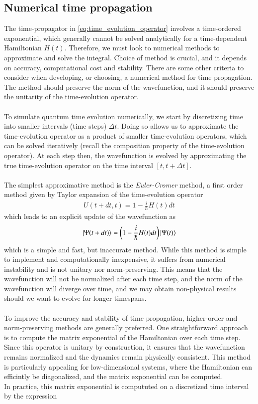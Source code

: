 \documentclass{subfiles}
\begin{document}
\subsection{Numerical time propagation}
The time-propagator in \eqref{eq:time_evolution_operator} involves a time-ordered exponential, which generally cannot be solved analytically for a time-dependent Hamiltonian $H(t)$. Therefore, we must look to numerical methods to approximate and solve the integral. Choice of method is crucial, and it depends on accuracy, computational cost and stability. There are some other criteria to consider when developing, or choosing, a numerical method for time propagation. The method should preserve the norm of the wavefunction, and it should preserve the unitarity of the time-evolution operator. 
\\\\ 
To simulate quantum time evolution numerically, we start by discretizing time into smaller intervals (time steps) $\Delta t$. Doing so allows us to approximate the time-evolution operator as a product of smaller time-evolution operators, which can be solved iteratively (recall the composition property of the time-evolution operator). At each step then, the wavefunction is evolved by approximating the true time-evolution operator on the time interval $[t, t+\Delta t]$. \\ \\
The simplest approximative method is the \emph{Euler-Cromer} method, a first order method given by Taylor expansion of the time-evolution operator
\begin{align}
    U(t + dt, t) = 1 - \frac{i}{\hbar}H(t)dt\label{eq:euler_cromer}
\end{align}
which leads to an explicit update of the wavefunction as 
\begin{align*}
    \ket{\Psi(t + dt)} = \bigg(1 - \frac{i}{\hbar}H(t)dt\bigg)\ket{\Psi(t)}
\end{align*}
which is a simple and fast, but inaccurate method. While this method is simple to implement and computationally inexpensive, it suffers from numerical instability and is not unitary nor norm-preserving. This means that the wavefunction will not be normalized after each time step, and the norm of the wavefunction will diverge over time, and we may obtain non-physical results should we want to evolve for longer timespans. \\ \\ 
To improve the accuracy and stability of time propagation, higher-order and norm-preserving methods are generally preferred. One straightforward approach is to compute the matrix exponential of the Hamiltonian over each time step. Since this operator is unitary by construction, it ensures that the wavefunction remains normalized and the dynamics remain physically consistent. This method is particularly appealing for low-dimensional systems, where the Hamiltonian can efficintly be diagonalized, and the matrix exponential can be computed. \\ In practice, this matrix exponential is compututed on a discretized time interval by the expression
\end{document}

